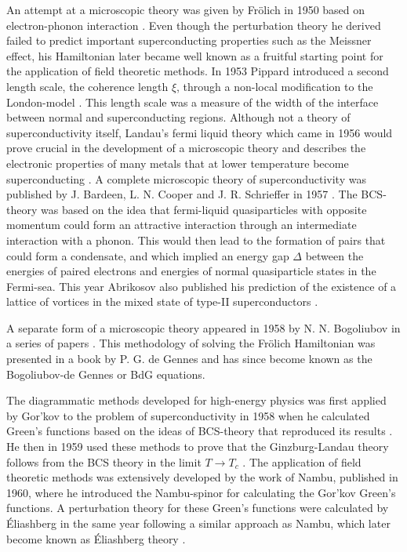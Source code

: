 An attempt at a microscopic theory was given by Fr\"olich in 1950 based on electron-phonon interaction \cite{Frolich50}. Even though the perturbation theory he derived
failed to predict important superconducting properties such as the Meissner effect, his Hamiltonian later became well known as a
fruitful starting point for the application of field theoretic methods.
In 1953 Pippard introduced a second length scale, the coherence length $\xi$, through a non-local modification to the London-model \cite{Pippard53}.
This length scale was a measure of the width of the interface between normal and superconducting regions. Although not a theory of superconductivity
itself, Landau's fermi liquid theory which came in 1956 would prove crucial in the development of a microscopic theory and describes the electronic
properties of many metals that at lower temperature become superconducting \cite{Landau56}. A complete microscopic theory of superconductivity was
published by J. Bardeen, L. N. Cooper and J. R. Schrieffer in 1957 \cite{Bardeen57,BCS}. The BCS-theory was based on the idea that fermi-liquid
quasiparticles with opposite momentum could form an attractive interaction through an intermediate interaction with a phonon. This would then lead
to the formation of pairs that could form a condensate, and which implied an energy gap $\Delta$ between the energies of paired electrons
and energies of normal quasiparticle states in the Fermi-sea. This year Abrikosov also published his prediction of the existence of a lattice of
vortices in the mixed state of type-II superconductors \cite{Abrikosov56}.

A separate form of a microscopic theory appeared in 1958 by N. N. Bogoliubov in a series of papers \cite{Bogoliubov58I, Bogoliubov58III, Bogoliubov58}.
This methodology of solving the Fr\"olich Hamiltonian was presented in a book \cite{deGennes66} by P. G. de Gennes and has since become known as
the Bogoliubov-de Gennes or BdG equations.

The diagrammatic methods developed for high-energy physics was first applied by Gor'kov to the
problem of superconductivity in 1958 when he calculated Green's functions based on the ideas of BCS-theory that reproduced
its results \cite{Gorkov58}. He then in 1959 used these methods to prove that the Ginzburg-Landau theory follows from the BCS theory in the limit $T\to T_c$ \cite{Gorkov59}.
The application of field theoretic methods was extensively developed by the work of Nambu, published in 1960, where he introduced the Nambu-spinor
for calculating the Gor'kov Green's functions. A perturbation theory for these Green's functions were calculated by \'Eliashberg in the same year
following a similar approach as Nambu, which later become known as \'Eliashberg theory \cite{Eliashberg60}.

